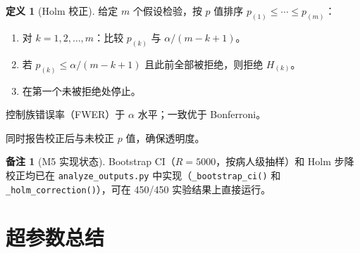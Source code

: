 \documentclass[11pt,a4paper]{article}
\theoremstyle{definition}
\newtheorem{definition}{定义}[section]
\newtheorem{remark}{备注}[section]
\begin{document}
\begin{definition}[Holm 校正]
给定 $m$ 个假设检验，按 $p$ 值排序 $p_{(1)} \leq \cdots \leq p_{(m)}$：
\begin{enumerate}
    \item 对 $k = 1,2,\ldots,m$：比较 $p_{(k)}$ 与 $\alpha/(m-k+1)$。
    \item 若 $p_{(k)} \leq \alpha/(m-k+1)$ 且此前全部被拒绝，则拒绝 $H_{(k)}$。
    \item 在第一个未被拒绝处停止。
\end{enumerate}
控制族错误率（FWER）于 $\alpha$ 水平；一致优于 Bonferroni。
\end{definition}

同时报告校正后与未校正 $p$ 值，确保透明度。

\begin{remark}[M5 实现状态]
Bootstrap CI（$R=5000$，按病人级抽样）和 Holm 步降校正均已在 \texttt{analyze\_outputs.py} 中实现（\texttt{\_bootstrap\_ci()} 和 \texttt{\_holm\_correction()}），可在 450/450 实验结果上直接运行。
\end{remark}


\section{超参数总结}
\end{document}
